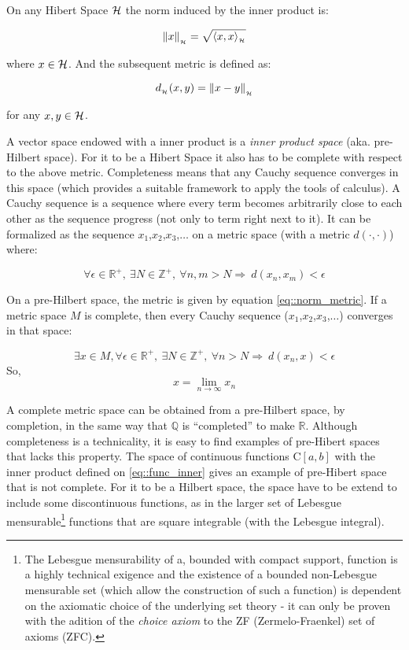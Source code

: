 On any Hibert Space $\mathcal{H}$ the norm induced by the inner product is:

\begin{equation}
  \left\lVert x\right\rVert_{_{\mathcal{H}}} = \sqrt{ \langle x,x\rangle_{_{\mathcal{H}}} }
\end{equation}

where $x \in \mathcal{H}$. And the subsequent metric is defined as:

\begin{equation}\label{eq::norm_metric}
  d_{_{\mathcal{H}}}(x,y) = \left\lVert x - y \right\rVert_{_{\mathcal{H}}}
\end{equation}

for any $x,y \in \mathcal{H}$.

A vector space endowed with a inner product is a \textit{inner product space}
(aka. pre-Hilbert space). For it to be a Hibert Space it also has to be complete
with respect to the above metric. Completeness means that any Cauchy sequence
converges in this space (which provides a suitable framework to apply the tools
of calculus). A Cauchy sequence is a sequence where every term becomes
arbitrarily close to each other as the sequence progress (not only to term
right next to it). It can be formalized as the sequence
$x_1$,$x_2$,$x_3$,$\ldots$ on a metric space (with a metric $d( \cdot ,\cdot)$)
where:


\[ \forall \epsilon \in \mathbb{R}^+, ~\exists N \in \mathbb{Z}^+, ~\forall
n,m>N \Longrightarrow ~d(x_n,x_m)<\epsilon
\]

On a pre-Hilbert space, the metric is given by equation \ref{eq::norm_metric}.
If a metric space $M$ is complete, then every Cauchy sequence
($x_1$,$x_2$,$x_3$,$\ldots$) converges in that space:

\[ \exists x \in M, \forall \epsilon \in \mathbb{R}^+, ~\exists N \in \mathbb{Z}^+, ~\forall
n>N \Longrightarrow ~d(x_n,x)<\epsilon
\]
So,
\[ x = \lim_{n\to\infty} x_n \]

A complete metric space can be obtained from a pre-Hilbert space, by completion,
in the same way that $\mathbb{Q}$ is ``completed'' to make $\mathbb{R}$.
Although completeness is a technicality, it is easy to find examples of
pre-Hibert spaces that lacks this property. The space of continuous functions
C$[a,b]$ with the inner product defined on \ref{eq::func_inner} gives an example
of pre-Hibert space that is not complete. For it to be a Hilbert space, the
space have to be extend to include some discontinuous functions, as in the larger
set of Lebesgue mensurable\footnote{The Lebesgue mensurability of a, bounded
with compact support, function is a highly technical exigence and the existence
of a bounded non-Lebesgue mensurable set (which allow the construction of such a
function) is dependent on the axiomatic choice of the underlying set theory - it
can only be proven with the adition of the \textit{choice axiom} to the
ZF (Zermelo-Fraenkel) set of axioms (ZFC). } functions that are square
integrable (with the Lebesgue integral).

